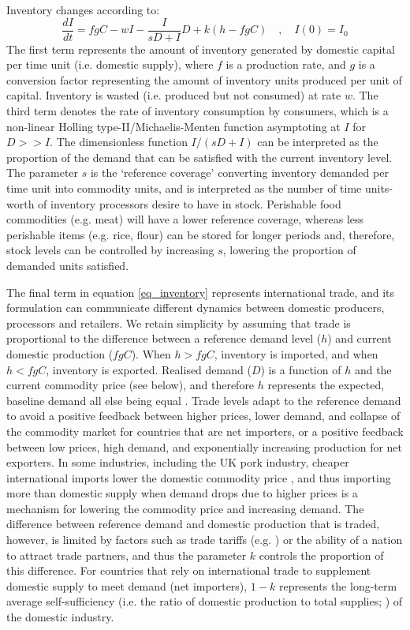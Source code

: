 \documentclass[12pt]{article}
\begin{document}
Inventory changes according to:
%
\begin{equation}
  \frac{dI}{dt} = f g C - w I - \frac{I}{sD + I} D + k (h - f g C) \quad, \quad I(0) = I_0
  \label{eq_inventory}
\end{equation}
%
The first term represents the amount of inventory generated by domestic capital per time unit (i.e. domestic supply), where $f$ is a production rate, and $g$ is a conversion factor representing the amount of inventory units produced per unit of capital. Inventory is wasted (i.e. produced but not consumed) at rate $w$. The third term denotes the rate of inventory consumption by consumers, which is a non-linear Holling type-II/Michaelis-Menten function asymptoting at $I$ for $D >> I$. The dimensionless function $I/(sD + I)$ can be interpreted as the proportion of the demand that can be satisfied with the current inventory level. The parameter $s$ is the `reference coverage' converting inventory demanded per time unit into commodity units, and is interpreted as the number of time units-worth of inventory processors desire to have in stock. Perishable food commodities (e.g. meat) will have a lower reference coverage, whereas less perishable items (e.g. rice, flour) can be stored for longer periods and, therefore, stock levels can be controlled by increasing $s$, lowering the proportion of demanded units satisfied.

The final term in equation \ref{eq_inventory} represents international trade, and its formulation can communicate different dynamics between domestic producers, processors and retailers. We retain simplicity by assuming that trade is proportional to the difference between a reference demand level ($h$) and current domestic production ($f g C$). When $h > f g C$, inventory is imported, and when $h < f g C$, inventory is exported. Realised demand ($D$) is a function of $h$ and the current commodity price (see below), and therefore $h$ represents the expected, baseline demand all else being equal \cite{sterman2000}. Trade levels adapt to the reference demand to avoid a positive feedback between higher prices, lower demand, and collapse of the commodity market for countries that are net importers, or a positive feedback between low prices, high demand, and exponentially increasing production for net exporters. In some industries, including the UK pork industry, cheaper international imports lower the domestic commodity price \cite{AHDBeuroexhange2015}, and thus importing more than domestic supply when demand drops due to higher prices is a mechanism for lowering the commodity price and increasing demand. The difference between reference demand and domestic production that is traded, however, is limited by factors such as trade tariffs (e.g. \cite{feng2017}) or the ability of a nation to attract trade partners, and thus the parameter $k$ controls the proportion of this difference. 
For countries that rely on international trade to supplement domestic supply to meet demand (net importers), $1 - k$ represents the long-term average self-sufficiency (i.e. the ratio of domestic production to total supplies; \cite{clapp2017}) of the domestic industry. 
\end{document}
